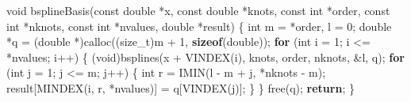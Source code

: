 \documentclass[
  12pt,
  letterpaper,
  DIV=11,
  numbers=noendperiod]{scrreprt}
\newenvironment{Shaded}{\begin{snugshade}}{\end{snugshade}}
\newcommand{\ControlFlowTok}[1]{\textcolor[rgb]{0.00,0.23,0.31}{\textbf{#1}}}
\newcommand{\DataTypeTok}[1]{\textcolor[rgb]{0.68,0.00,0.00}{#1}}
\newcommand{\DecValTok}[1]{\textcolor[rgb]{0.68,0.00,0.00}{#1}}
\newcommand{\KeywordTok}[1]{\textcolor[rgb]{0.00,0.23,0.31}{\textbf{#1}}}
\newcommand{\NormalTok}[1]{\textcolor[rgb]{0.00,0.23,0.31}{#1}}
\newcommand{\OperatorTok}[1]{\textcolor[rgb]{0.37,0.37,0.37}{#1}}
\theoremstyle{remark}
\begin{document}
\begin{Shaded}
\begin{Highlighting}[]
\DataTypeTok{void}\NormalTok{ bsplineBasis}\OperatorTok{(}\DataTypeTok{const} \DataTypeTok{double} \OperatorTok{*}\NormalTok{x}\OperatorTok{,} \DataTypeTok{const} \DataTypeTok{double} \OperatorTok{*}\NormalTok{knots}\OperatorTok{,} \DataTypeTok{const} \DataTypeTok{int} \OperatorTok{*}\NormalTok{order}\OperatorTok{,}
                  \DataTypeTok{const} \DataTypeTok{int} \OperatorTok{*}\NormalTok{nknots}\OperatorTok{,} \DataTypeTok{const} \DataTypeTok{int} \OperatorTok{*}\NormalTok{nvalues}\OperatorTok{,} \DataTypeTok{double} \OperatorTok{*}\NormalTok{result}\OperatorTok{)} \OperatorTok{\{}
    \DataTypeTok{int}\NormalTok{ m }\OperatorTok{=} \OperatorTok{*}\NormalTok{order}\OperatorTok{,}\NormalTok{ l }\OperatorTok{=} \DecValTok{0}\OperatorTok{;}
    \DataTypeTok{double} \OperatorTok{*}\NormalTok{q }\OperatorTok{=} \OperatorTok{(}\DataTypeTok{double} \OperatorTok{*)}\NormalTok{calloc}\OperatorTok{((}\DataTypeTok{size\_t}\OperatorTok{)}\NormalTok{m }\OperatorTok{+} \DecValTok{1}\OperatorTok{,} \KeywordTok{sizeof}\OperatorTok{(}\DataTypeTok{double}\OperatorTok{));}
    \ControlFlowTok{for} \OperatorTok{(}\DataTypeTok{int}\NormalTok{ i }\OperatorTok{=} \DecValTok{1}\OperatorTok{;}\NormalTok{ i }\OperatorTok{\textless{}=} \OperatorTok{*}\NormalTok{nvalues}\OperatorTok{;}\NormalTok{ i}\OperatorTok{++)} \OperatorTok{\{}
        \OperatorTok{(}\DataTypeTok{void}\OperatorTok{)}\NormalTok{bsplines}\OperatorTok{(}\NormalTok{x }\OperatorTok{+}\NormalTok{ VINDEX}\OperatorTok{(}\NormalTok{i}\OperatorTok{),}\NormalTok{ knots}\OperatorTok{,}\NormalTok{ order}\OperatorTok{,}\NormalTok{ nknots}\OperatorTok{,} \OperatorTok{\&}\NormalTok{l}\OperatorTok{,}\NormalTok{ q}\OperatorTok{);}
        \ControlFlowTok{for} \OperatorTok{(}\DataTypeTok{int}\NormalTok{ j }\OperatorTok{=} \DecValTok{1}\OperatorTok{;}\NormalTok{ j }\OperatorTok{\textless{}=}\NormalTok{ m}\OperatorTok{;}\NormalTok{ j}\OperatorTok{++)} \OperatorTok{\{}
            \DataTypeTok{int}\NormalTok{ r }\OperatorTok{=}\NormalTok{ IMIN}\OperatorTok{(}\NormalTok{l }\OperatorTok{{-}}\NormalTok{ m }\OperatorTok{+}\NormalTok{ j}\OperatorTok{,} \OperatorTok{*}\NormalTok{nknots }\OperatorTok{{-}}\NormalTok{ m}\OperatorTok{);}
\NormalTok{            result}\OperatorTok{[}\NormalTok{MINDEX}\OperatorTok{(}\NormalTok{i}\OperatorTok{,}\NormalTok{ r}\OperatorTok{,} \OperatorTok{*}\NormalTok{nvalues}\OperatorTok{)]} \OperatorTok{=}\NormalTok{ q}\OperatorTok{[}\NormalTok{VINDEX}\OperatorTok{(}\NormalTok{j}\OperatorTok{)];}
        \OperatorTok{\}}
    \OperatorTok{\}}
\NormalTok{    free}\OperatorTok{(}\NormalTok{q}\OperatorTok{);}
    \ControlFlowTok{return}\OperatorTok{;}
\OperatorTok{\}}


\end{Highlighting}
\end{Shaded}
\end{document}
